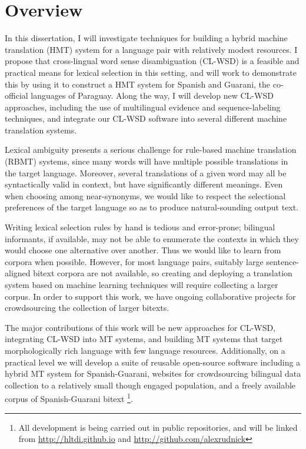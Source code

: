 \chapter{Overview}
In this dissertation, I will investigate techniques for building a hybrid
machine translation (HMT) system for a language pair with relatively modest
resources.
I propose that cross-lingual word sense disambiguation (CL-WSD) is a feasible
and practical means for lexical selection in this setting, and will work to
demonstrate this by using it to construct a HMT system for Spanish and Guarani,
the co-official languages of Paraguay.
Along the way, I will develop new CL-WSD approaches, including the use of
multilingual evidence and sequence-labeling techniques, and integrate our
CL-WSD software into several different machine translation systems.

Lexical ambiguity presents a serious challenge for rule-based machine
translation (RBMT) systems, since many words will have multiple possible
translations in the target language. Moreover, several translations of a given
word may all be syntactically valid in context, but have significantly
different meanings. Even when choosing among near-synonyms, we would like to
respect the selectional preferences of the target language so as to produce
natural-sounding output text.

Writing lexical selection rules by hand is tedious and error-prone; bilingual
informants, if available, may not be able to enumerate the contexts in which
they would choose one alternative over another. Thus we would like to learn
from corpora when possible. However, for most language pairs, suitably large
sentence-aligned bitext corpora are not available, so creating and deploying a
translation system based on machine learning techniques will require collecting
a larger corpus. In order to support this work, we have ongoing collaborative
projects for crowdsourcing the collection of larger bitexts.

The major contributions of this work will be new approaches for CL-WSD,
integrating CL-WSD into MT systems, and building MT systems that target
morphologically rich language with few language resources.  Additionally, on a
practical level we will develop a suite of reusable open-source software
including a hybrid MT system for Spanish-Guarani, websites for crowdsourcing
bilingual data collection to a relatively small though engaged population, and
a freely available corpus of Spanish-Guarani bitext
\footnote{All development is being carried out in public repositories, and will
be linked from \url{http://hltdi.github.io} and
\url{http://github.com/alexrudnick}}.

